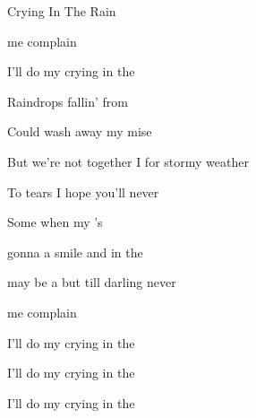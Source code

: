 \begin{SBSong}{Crying In The Rain}
\begin{SBVerse}
     me complain  
    
    I'll do my crying in the    
  \end{SBVerse}
  \CBPageBrk
  \begin{SBChorus}
     Raindrops fallin' from  
    
    Could  wash away my mise
    
    But  we're not together I  for stormy weather 
    
    To   tears I hope you'll never  
  \end{SBChorus}
  
  \begin{SBVerse}
     Some  when my 's 
    
     gonna  a smile and  in the  
    
     may be a  but till  darling  never 
    
     me complain  
    
    I'll do my crying in the    
    
    I'll do my crying in the    
    
    I'll do my crying in the     
  \end{SBVerse}
\end{SBSong}
